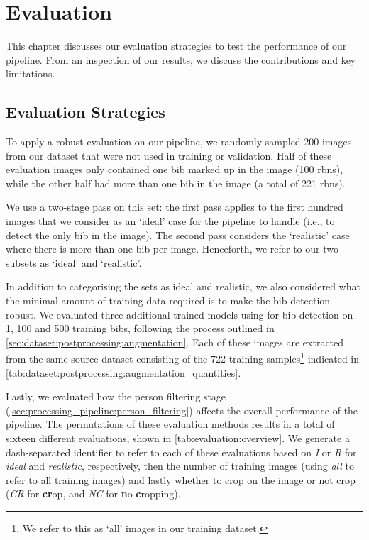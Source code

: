 \chapter{Evaluation}
\label{ch:evaluation}

This chapter discusses our evaluation strategies to test the performance of our pipeline. From an inspection of our results, we discuss the contributions and key limitations.

\section{Evaluation Strategies}
\label{sec:evaluation:strategies}

To apply a robust evaluation on our pipeline, we randomly sampled 200 images from our dataset that were not used in training or validation. Half of these evaluation images only contained one bib marked up in the image (100 \glspl{rbn}), while the other half had more than one bib in the image (a total of 221 \glspl{rbn}).

We use a two-stage pass on this set: the first pass applies to the first hundred images that we consider as an `ideal' case for the pipeline to handle (i.e., to detect the only bib in the image). The second pass considers the `realistic' case where there is more than one bib per image. Henceforth, we refer to our two subsets as `ideal' and `realistic'.

In addition to categorising the sets as ideal and realistic, we also considered what the minimal amount of training data required is to make the bib detection robust. We evaluated three additional trained models using \frcnn{} for bib detection on 1, 100 and 500 training bibs, following the process outlined in \cref{sec:dataset:postprocessing:augmentation}. Each of these images are extracted from the same source dataset consisting of the 722 training samples\footnote{We refer to this as `all' images in our training dataset.} indicated in \cref{tab:dataset:postprocessing:augmentation_quantities}. 

Lastly, we evaluated how the person filtering stage (\cref{sec:processing_pipeline:person_filtering}) affects the overall performance of the pipeline. The permutations of these evaluation methods results in a total of sixteen different evaluations, shown in \cref{tab:evaluation:overview}. We generate a dash-separated identifier to refer to each of these evaluations based on \textit{I} or \textit{R} for \textit{ideal} and \textit{realistic}, respectively, then the number of training images (using \textit{all} to refer to all training images) and lastly whether to crop on the image or not crop (\textit{CR} for \textbf{cr}op, and \textit{NC} for \textbf{n}o \textbf{c}ropping).

